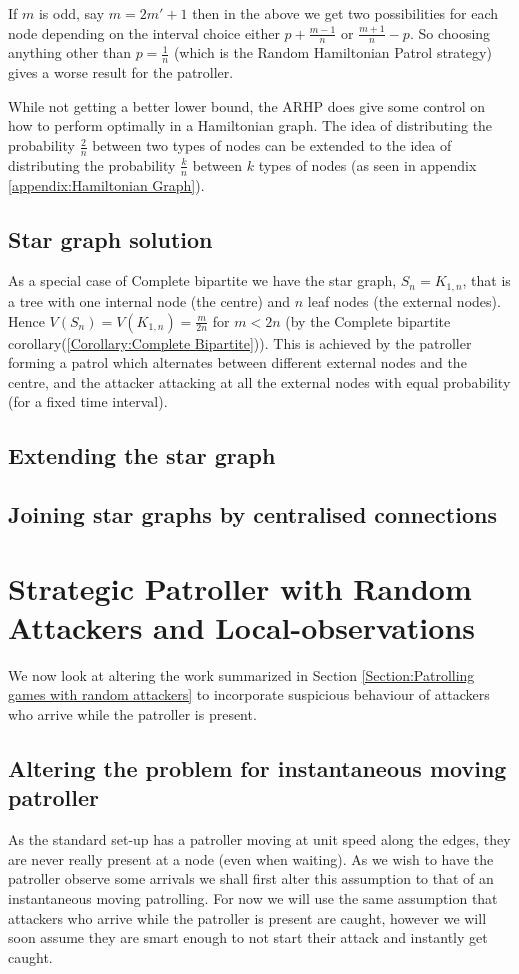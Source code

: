 \documentclass[a4paper,10pt]{article}
\theoremstyle{definition}
\theoremstyle{definition}
\theoremstyle{remark}
\theoremstyle{definition}
\begin{document}
If $m$ is odd, say $m=2m'+1$ then in the above we get two possibilities for each node depending on the interval choice either $p+\frac{m-1}{n}$ or $\frac{m+1}{n}-p$. So choosing anything other than $p=\frac{1}{n}$ (which is the Random Hamiltonian Patrol strategy) gives a worse result for the patroller.

While not getting a better lower bound, the ARHP does give some control on how to perform optimally in a Hamiltonian graph. The idea of distributing the probability $\frac{2}{n}$ between two types of nodes can be extended to the idea of distributing the probability $\frac{k}{n}$ between $k$ types of nodes (as seen in appendix \ref{appendix:Hamiltonian Graph}).
\subsection{Star graph solution}
As a special case of Complete bipartite we have the star graph, $S_{n}=K_{1,n}$, that is a tree with one internal node (the centre) and $n$ leaf nodes (the external nodes). Hence $V(S_{n})=V(K_{1,n})=\frac{m}{2n}$ for $m<2n$ (by the Complete bipartite corollary(\ref{Corollary:Complete Bipartite})). This is achieved by the patroller forming a patrol which alternates between different  external nodes and the centre, and the attacker attacking at all the external nodes with equal probability (for a fixed time interval).
\subsection{Extending the star graph}
\subsection{Joining star graphs by centralised connections}

\section{Strategic Patroller with Random Attackers and Local-observations}
\label{Section:Patrolling games with random attackers and local-observations}
We now look at altering the work summarized in Section \ref{Section:Patrolling games with random attackers} to incorporate suspicious behaviour of attackers who arrive while the patroller is present.

\subsection{Altering the problem for instantaneous moving patroller}
As the standard set-up has a patroller moving at unit speed along the edges, they are never really present at a node (even when waiting). As we wish to have the patroller observe some arrivals we shall first alter this assumption to that of an instantaneous moving patrolling. For now we will use the same assumption that attackers who arrive while the patroller is present are caught, however we will soon assume they are smart enough to not start their attack and instantly get caught.
\end{document}
